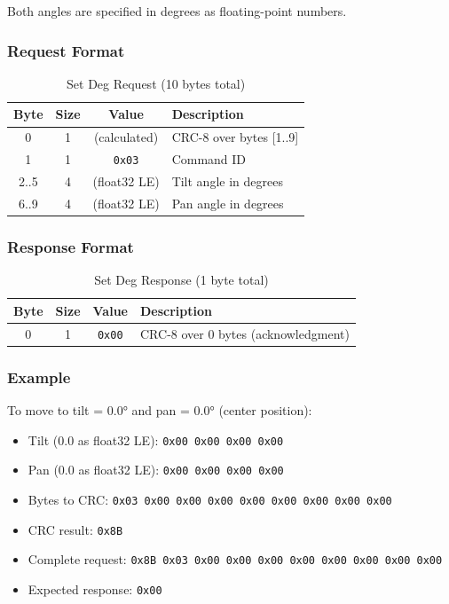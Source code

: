 \documentclass[12pt, titlepage]{article}
\begin{document}
Both angles are specified in degrees as floating-point numbers.

\subsubsection{Request Format}

\begin{table}[H]
  \centering
  \begin{tabular}{cccl}
    \toprule
    \textbf{Byte} & \textbf{Size} & \textbf{Value} & \textbf{Description}    \\
    \midrule
    0             & 1             & (calculated)   & CRC-8 over bytes [1..9] \\
    1             & 1             & \texttt{0x03}  & Command ID              \\
    2..5          & 4             & (float32 LE)   & Tilt angle in degrees   \\
    6..9          & 4             & (float32 LE)   & Pan angle in degrees    \\
    \bottomrule
  \end{tabular}
  \caption{Set Deg Request (10 bytes total)}
\end{table}

\subsubsection{Response Format}

\begin{table}[H]
  \centering
  \begin{tabular}{cccl}
    \toprule
    \textbf{Byte} & \textbf{Size} & \textbf{Value} & \textbf{Description}                \\
    \midrule
    0             & 1             & \texttt{0x00}  & CRC-8 over 0 bytes (acknowledgment) \\
    \bottomrule
  \end{tabular}
  \caption{Set Deg Response (1 byte total)}
\end{table}

\subsubsection{Example}

To move to tilt = 0.0° and pan = 0.0° (center position):
\begin{itemize}
  \item Tilt (0.0 as float32 LE): \texttt{0x00 0x00 0x00 0x00}
  \item Pan (0.0 as float32 LE): \texttt{0x00 0x00 0x00 0x00}
  \item Bytes to CRC: \texttt{0x03 0x00 0x00 0x00 0x00 0x00 0x00 0x00 0x00}
  \item CRC result: \texttt{0x8B}
  \item Complete request: \texttt{0x8B 0x03 0x00 0x00 0x00 0x00 0x00 0x00 0x00 0x00}
  \item Expected response: \texttt{0x00}
\end{itemize}
\end{document}
